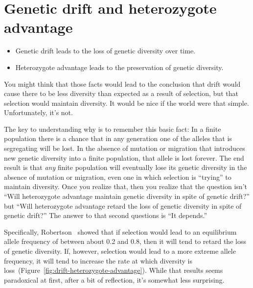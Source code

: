 \documentclass[12pt]{article}
\begin{document}
\section*{Genetic drift and heterozygote advantage}

\begin{itemize}

\item Genetic drift leads to the loss of genetic diversity over time. 

\item Heterozygote advantage leads to the preservation of genetic diversity.

\end{itemize}

You might think that those facts would lead to the conclusion that
drift would cause there to be less diversity than expected as a result
of selection, but that selection would maintain diversity. It would be
nice if the world were that simple. Unfortunately, it's not. 

The key to understanding why is to remember this basic fact: In a
finite population there is a chance that in any generation one of the
alleles that is segregating will be lost. In the absence of mutation
or migration that introduces new genetic diversity into a finite
population, that allele is lost forever. The end result is that {\it
  any\/} finite population will eventually lose its genetic diversity
in the absence of mutation or migration, even one in which selection
is ``trying'' to maintain diversity. Once you realize that, then you
realize that the question isn't ``Will heterozygote advantage maintain
genetic diversity in spite of genetic drift?'' but ``Will heterozygote
advantage retard the loss of genetic diversity in spite of genetic
drift?'' The answer to that second questions is ``It depends.''

Specifically, Robertson~\cite{Robertson-1962} showed that if selection
would lead to an equilibrium allele frequency of between about 0.2 and
0.8, then it will tend to retard the loss of genetic diversity. If,
however, selection would lead to a more extreme allele frequency, it
will tend to increase the rate at which diversity is
loss~(Figure~\ref{fig:drift-heterozygote-advantage}). While that
results seems paradoxical at first, after a bit of reflection, it's
somewhat less surprising.
\end{document}
